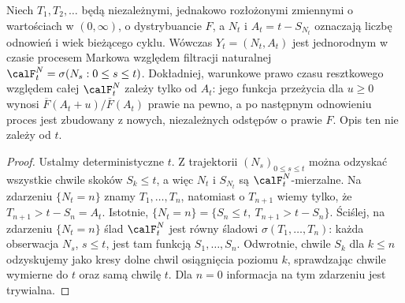 \begin{twierdzenie}
\label{thm:wiek-markow}
Niech $T_1,T_2,\ldots$ będą niezależnymi, jednakowo rozłożonymi
zmiennymi o wartościach w $(0,\infty)$, o dystrybuancie $F$,
a $N_t$ i $A_t=t-S_{N_t}$ oznaczają liczbę odnowień i wiek
bieżącego cyklu. Wówczas $Y_t=(N_t,A_t)$ jest jednorodnym
w czasie procesem Markowa względem filtracji naturalnej
$\calF_t^N=\sigma(N_s:0\le s\le t)$.
Dokładniej, warunkowe prawo czasu resztkowego
względem całej $\calF_t^N$ zależy tylko od $A_t$:
jego funkcja przeżycia dla $u\ge0$ wynosi
$\overline F(A_t+u)/\overline F(A_t)$ prawie na pewno,
a po następnym odnowieniu proces jest zbudowany z nowych,
niezależnych odstępów o prawie $F$. Opis ten nie zależy od $t$.
\end{twierdzenie}
\begin{proof}
Ustalmy deterministyczne $t$. Z trajektorii $(N_s)_{0\le s\le t}$
można odzyskać wszystkie chwile skoków $S_k\le t$, a więc
$N_t$ i $S_{N_t}$ są $\calF_t^N$-mierzalne. Na zdarzeniu
$\{N_t=n\}$ znamy $T_1,\ldots,T_n$, natomiast o $T_{n+1}$
wiemy tylko, że $T_{n+1}>t-S_n=A_t$. Istotnie,
$\{N_t=n\}=\{S_n\le t,\ T_{n+1}>t-S_n\}$.
Ściślej, na zdarzeniu $\{N_t=n\}$ ślad
$\calF_t^N$ jest równy śladowi
$\sigma(T_1,\ldots,T_n)$: każda obserwacja $N_s$,
$s\le t$, jest tam funkcją $S_1,\ldots,S_n$.
Odwrotnie, chwile $S_k$ dla $k\le n$ odzyskujemy
jako kresy dolne chwil osiągnięcia poziomu $k$,
sprawdzając chwile wymierne do $t$ oraz samą chwilę $t$.
Dla $n=0$ informacja na tym zdarzeniu jest trywialna.


\end{proof}
